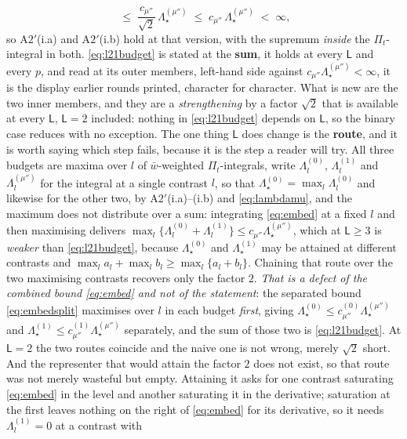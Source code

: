 \begin{lemma}
\begin{enumerate}
\begin{equation}
\;\le\;\frac{c_{\mu''}}{\sqrt2}\,\Lambda^{(\mu'')}_\star
\;\le\;c_{\mu''}\,\Lambda^{(\mu'')}_\star\;<\;\infty ,
\end{equation}
so A$2'$(i.a) and A$2'$(i.b) hold at that version, with the supremum \emph{inside} the
$\Pi_t$-integral in both.
\eqref{eq:l21budget} is stated at the \textbf{sum}, it holds at every $\mathsf L$ and every $p$,
and read at its outer members, left-hand side against $c_{\mu''}\Lambda^{(\mu'')}_\star<\infty$, 
it is the display earlier rounds printed, character for character. What is new are the two inner
members, and they are a \emph{strengthening} by a factor $\sqrt2$ that is available at
every $\mathsf L$, $\mathsf L=2$ included: nothing in \eqref{eq:l21budget} depends on $\mathsf L$, so
the binary case reduces with no exception.
The one thing $\mathsf L$ does change is the \textbf{route}, and it is worth saying which step
fails, because it is the step a reader will try. All three budgets are maxima over $l$ of
$\bar w$-weighted $\Pi_t$-integrals, write $\Lambda^{(0)}_l$, $\Lambda^{(1)}_l$ and
$\Lambda^{(\mu'')}_l$ for the integral at a single contrast $l$, so that
$\Lambda^{(0)}_\star=\max_l\Lambda^{(0)}_l$ and likewise for the other two, by A$2'$(i.a)--(i.b) and
\eqref{eq:lambdamu}, and the maximum does not distribute over a sum: integrating
\eqref{eq:embed} at a fixed $l$ and then maximising delivers
$\max_l\{\Lambda^{(0)}_l+\Lambda^{(1)}_l\}\le c_{\mu''}\Lambda^{(\mu'')}_\star$, which at $\mathsf L\ge3$
is \emph{weaker} than \eqref{eq:l21budget}, because $\Lambda^{(0)}_\star$ and $\Lambda^{(1)}_\star$ may
be attained at different contrasts and $\max_l a_l+\max_l b_l\ge\max_l\{a_l+b_l\}$. Chaining that route
over the two maximising contrasts recovers only the factor $2$. \emph{That is a defect of the combined
bound \eqref{eq:embed} and not of the statement}: the separated bound \eqref{eq:embedsplit} maximises
over $l$ in each budget \emph{first}, giving $\Lambda^{(0)}_\star\le c^{(0)}_{\mu''}\Lambda^{(\mu'')}_\star$
and $\Lambda^{(1)}_\star\le c^{(1)}_{\mu''}\Lambda^{(\mu'')}_\star$ separately, and the sum of those two
is \eqref{eq:l21budget}. At $\mathsf L=2$ the two routes coincide and the naive one is not wrong, merely
$\sqrt2$ short.
And the representer that would attain the factor $2$ does not exist, so that route was not merely
wasteful but empty. Attaining it asks for one contrast saturating \eqref{eq:embed} in the level and
another saturating it in the derivative; saturation at the first leaves nothing on the right of
\eqref{eq:embed} for its derivative, so it needs $\Lambda^{(1)}_l=0$ at a contrast with

\end{enumerate}
\end{lemma}
